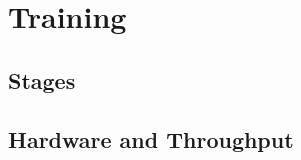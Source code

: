 %

\section{Training}
\label{sec:training}


\subsection{Stages}
\label{subsec:training_stages}


\subsection{Hardware and Throughput}
\label{subsec:training_hardware}

